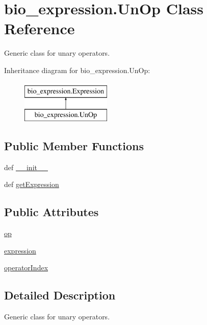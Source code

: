 \hypertarget{classbio__expression_1_1_un_op}{\section{bio\+\_\+expression.\+Un\+Op Class Reference}
\label{classbio__expression_1_1_un_op}
}


Generic class for unary operators.  


Inheritance diagram for bio\+\_\+expression.\+Un\+Op\+:\begin{figure}[H]
\begin{center}
\leavevmode
\includegraphics[height=2.000000cm]{d2/dc7/classbio__expression_1_1_un_op}
\end{center}
\end{figure}
\subsection*{Public Member Functions}
\begin{DoxyCompactItemize}
\item 
def \hyperlink{classbio__expression_1_1_un_op_a43aa93c31c7a81decd31098b86ac8985}{\+\_\+\+\_\+init\+\_\+\+\_\+}
\item 
def \hyperlink{classbio__expression_1_1_un_op_a50606bee1907e784ac19d0ec39a3fb62}{get\+Expression}
\end{DoxyCompactItemize}
\subsection*{Public Attributes}
\begin{DoxyCompactItemize}
\item 
\hyperlink{classbio__expression_1_1_un_op_a2790ba638c53bee9402c6ed762f0b919}{op}
\item 
\hyperlink{classbio__expression_1_1_un_op_a33f0fb23ad12aea397027bc0276081dc}{expression}
\item 
\hyperlink{classbio__expression_1_1_un_op_aa7c4a48c299e7b44e49d3f7a68fa40ec}{operator\+Index}
\end{DoxyCompactItemize}


\subsection{Detailed Description}
Generic class for unary operators. 

